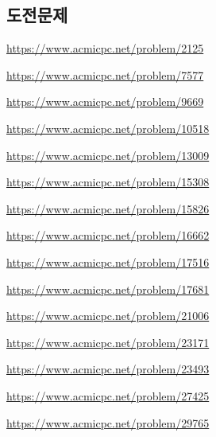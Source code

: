 \subsection{도전문제}
\begin{problem} \url{https://www.acmicpc.net/problem/2125} \end{problem}
\begin{problem} \url{https://www.acmicpc.net/problem/7577} \end{problem}
\begin{problem} \url{https://www.acmicpc.net/problem/9669} \end{problem}
\begin{problem} \url{https://www.acmicpc.net/problem/10518} \end{problem}
\begin{problem} \url{https://www.acmicpc.net/problem/13009} \end{problem}
\begin{problem} \url{https://www.acmicpc.net/problem/15308} \end{problem}
\begin{problem} \url{https://www.acmicpc.net/problem/15826} \end{problem}
\begin{problem} \url{https://www.acmicpc.net/problem/16662} \end{problem}
\begin{problem} \url{https://www.acmicpc.net/problem/17516} \end{problem}
\begin{problem} \url{https://www.acmicpc.net/problem/17681} \end{problem}
\begin{problem} \url{https://www.acmicpc.net/problem/21006} \end{problem}
\begin{problem} \url{https://www.acmicpc.net/problem/23171} \end{problem}
\begin{problem} \url{https://www.acmicpc.net/problem/23493} \end{problem}
\begin{problem} \url{https://www.acmicpc.net/problem/27425} \end{problem}
\begin{problem} \url{https://www.acmicpc.net/problem/29765} \end{problem}